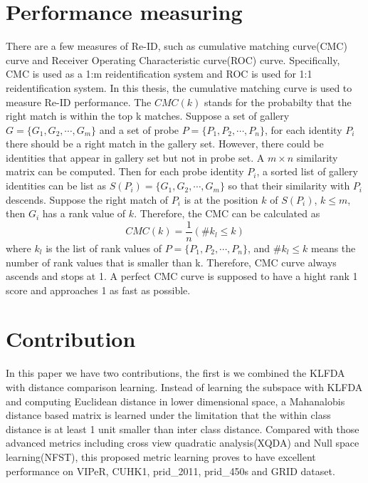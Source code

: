 \section{Performance measuring}

There are a few measures of Re-ID, such as cumulative matching curve(CMC) curve and Receiver Operating Characteristic curve(ROC) curve. Specifically, CMC is used as a 1:m reidentification system and ROC is used for 1:1 reidentification system.  In this thesis, the cumulative matching curve is used to measure Re-ID performance. The $CMC(k)$  stands for the probabilty that the right match is within the top k matches. Suppose a set of gallery $G = \{G_1,G_2,\cdots,G_m\}$ and a set of probe $P = \{P_1,P_2,\cdots,P_n\}$, for each identity $P_i$ there should be a right match in the gallery set. However, there could be identities that appear in gallery set but not in probe set. A $m\times n$ similarity matrix can be computed. Then for each probe identity $P_i$, a sorted list of gallery identities can be list as $S(P_i) = \{{G_{1},G_{2},\cdots,G_{m}}\}$ so that their similarity with $P_i$ descends. Suppose the right match of $P_i$ is at the position $k$ of $S(P_i)$, $k\le m$, then $G_i$ has a rank value of $k$. Therefore, the CMC can be calculated as 
\begin{equation}
CMC(k) = \frac{1}{n}(\#k_l\le k)
\end{equation}
where $k_l$ is the list of rank values of $P = \{P_1,P_2,\cdots,P_n\}$, and $\#k_l\le k$ means the number of rank values that is smaller than k.  Therefore, CMC curve always ascends and stops at 1.  A perfect CMC curve is supposed to have a hight rank 1 score and approaches 1 as fast as possible.




\section{Contribution}

In this paper we have two contributions, the first is we combined the KLFDA with distance comparison learning. Instead of learning the subspace with KLFDA and computing Euclidean distance in lower dimensional space, a Mahanalobis distance based matrix is learned under the limitation that the within class distance is at least 1 unit smaller than inter class distance. Compared with those advanced metrics including cross view quadratic analysis(XQDA) \cite{LOMO} and Null space learning(NFST), this proposed metric learning proves to have excellent performance on VIPeR, CUHK1, prid\_2011, prid\_450s and GRID dataset.

